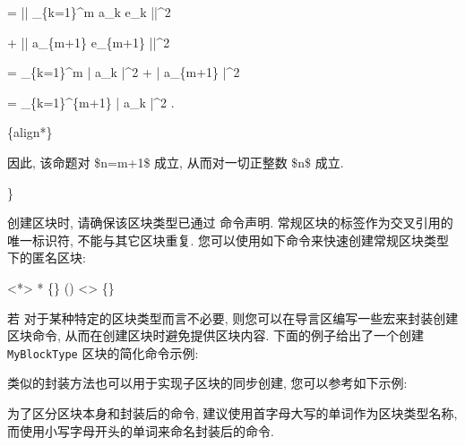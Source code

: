 {    \par\indent\indent = || \_\{k=1\}\^{}m a\_k  e\_k ||\^{}2
    \par\indent\indent + || a\_\{m+1\}  e\_\{m+1\} ||\^{}2
    \par\indent\indent = \_\{k=1\}\^{}m | a\_k |\^{}2 + | a\_\{m+1\} |\^{}2
    \par\indent\indent = \_\{k=1\}\^{}\{m+1\} | a\_k |\^{}2 \cs{ }.
    \par {}\{align*\}
    \par 因此, 该命题对 \$n=m+1\$ 成立, 从而对一切正整数 \$n\$ 成立.
    \par\noindent \}
}

\AutomaticListon

创建区块时, 请确保该区块类型已通过  命令声明. 常规区块的标签作为交叉引用的唯一标识符, 不能与其它区块重复. 您可以使用如下命令来快速创建常规区块类型下的匿名区块:

<*>{
    *
    \{\}
    ()
    <>
    \{\longarg\}
}

若  对于某种特定的区块类型而言不必要, 则您可以在导言区编写一些宏来封装创建区块命令, 从而在创建区块时避免提供区块内容. 下面的例子给出了一个创建 \texttt{MyBlockType} 区块的简化命令示例:


类似的封装方法也可以用于实现子区块的同步创建, 您可以参考如下示例:

\newpage


为了区分区块本身和封装后的命令, 建议使用首字母大写的单词作为区块类型名称, 而使用小写字母开头的单词来命名封装后的命令.

\newpage
